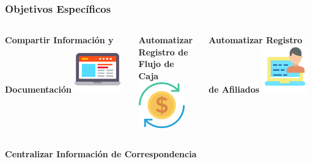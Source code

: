 \documentclass[xcolor=dvipsnames, xcolor=table]{beamer}
\begin{document}
\begin{frame}
    \frametitle{Objetivos Específicos}
    \vspace{3mm}
    \begin{columns}
      \begin{column}{0.3\textwidth}
        \centering\textbf{\textcolor{color3}{\small Compartir Información y Documentación}\vspace{3mm}}
        \vspace{10mm}
        \includegraphics[width=20mm]{033-laptop}
      \end{column}
      \begin{column}{0.3\textwidth}
        \centering\textbf{\textcolor{color3}{\small Automatizar Registro de\\Flujo de Caja}\vspace{3mm}}
        \vspace{10mm}
        \includegraphics[width=20mm]{019-coin}
      \end{column}
      \begin{column}{0.3\textwidth}
        \centering\textbf{\textcolor{color3}{\small Automatizar Registro de Afiliados}\vspace{3mm}}
        \vspace{10mm}
        \includegraphics[width=20mm]{laptop}
      \end{column}
    \end{columns}
    \vspace{-5mm}
    \begin{columns}
      \begin{column}{0.3\textwidth}
        \centering\textbf{\textcolor{color3}{\small Centralizar Información de Correspondencia}\vspace{3mm}}
        \vspace{10mm}

\end{column}
\end{columns}
\end{frame}
\end{document}
